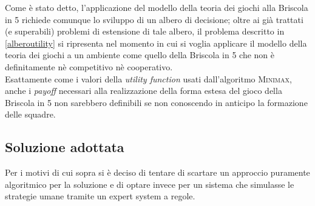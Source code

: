 Come è stato detto, l'applicazione del modello della teoria dei giochi alla Briscola in 5 richiede comunque lo sviluppo di un albero di decisione; oltre ai già trattati (e superabili) problemi di estensione di tale albero, il problema descritto in \ref{alberoutility} si ripresenta nel momento in cui si voglia applicare il modello della teoria dei giochi a un ambiente come quello della Briscola in 5 che non è definitamente nè competitivo nè cooperativo.\\
Esattamente come i valori della \emph{utility function} usati dall'algoritmo \textsc{Minimax}, anche i \emph{payoff} necessari alla realizzazione della forma estesa del gioco della Briscola in 5 non sarebbero definibili se non conoscendo in anticipo la formazione delle squadre.


\subsection{Soluzione adottata}
Per i motivi di cui sopra si è deciso di tentare di scartare un approccio puramente algoritmico per la soluzione e di optare invece per un sistema che simulasse le strategie umane tramite un expert system a regole.
